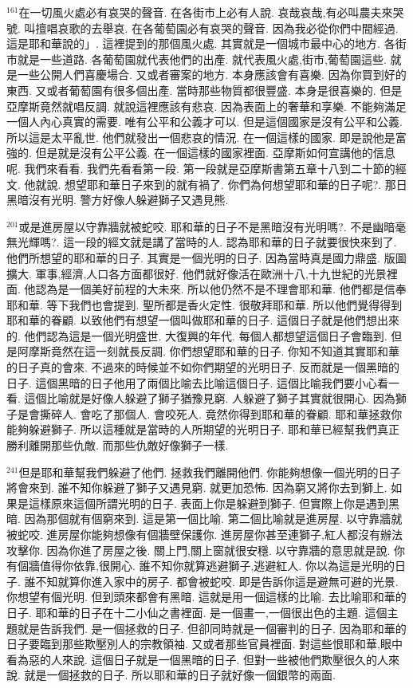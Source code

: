 \documentclass{book}
\begin{document}
$^{161}$在一切風火處必有哀哭的聲音.
在各街市上必有人說.
哀哉哀哉,有必叫農夫來哭號.
叫擅唱哀歌的去舉哀.
在各葡萄園必有哀哭的聲音.
因為我必從你們中間經過.
這是耶和華說的」.
這裡提到的那個風火處.
其實就是一個城市最中心的地方.
各街市就是一些道路.
各葡萄園就代表他們的出產.
就代表風火處,街市,葡萄園這些.
就是一些公開人們喜慶場合.
又或者審案的地方.
本身應該會有喜樂.
因為你買到好的東西.
又或者葡萄園有很多個出產.
當時那些物質都很豐盛.
本身是很喜樂的.
但是亞摩斯竟然就唱反調.
就說這裡應該有悲哀.
因為表面上的奢華和享樂.
不能夠滿足一個人內心真實的需要.
唯有公平和公義才可以.
但是這個國家是沒有公平和公義.
所以這是太平亂世.
他們就發出一個悲哀的情況.
在一個這樣的國家.
即是說他是富強的.
但是就是沒有公平公義.
在一個這樣的國家裡面.
亞摩斯如何宣講他的信息呢.
我們來看看.
我們先看看第一段.
第一段就是亞摩斯書第五章十八到二十節的經文.
他就說.
想望耶和華日子來到的就有禍了.
你們為何想望耶和華的日子呢?.
那日黑暗沒有光明.
警方好像人躲避獅子又遇見熊.

$^{201}$或是進房屋以守靠牆就被蛇咬.
耶和華的日子不是黑暗沒有光明嗎?.
不是幽暗毫無光輝嗎?.
這一段的經文就是講了當時的人.
認為耶和華的日子就要很快來到了.
他們所想望的耶和華的日子.
其實是一個光明的日子.
因為當時真是國力鼎盛.
版圖擴大.
軍事,經濟,人口各方面都很好.
他們就好像活在歐洲十八,十九世紀的光景裡面.
他認為是一個美好前程的大未來.
所以他仍然不是不理會耶和華.
他們都是信奉耶和華.
等下我們也會提到.
聖所都是香火定性.
很敬拜耶和華.
所以他們覺得得到耶和華的眷顧.
以致他們有想望一個叫做耶和華的日子.
這個日子就是他們想出來的.
他們認為這是一個光明盛世.
大復興的年代.
每個人都想望這個日子會臨到.
但是阿摩斯竟然在這一刻就長反調.
你們想望耶和華的日子.
你知不知道其實耶和華的日子真的會來.
不過來的時候並不如你們期望的光明日子.
反而就是一個黑暗的日子.
這個黑暗的日子他用了兩個比喻去比喻這個日子.
這個比喻我們要小心看一看.
這個比喻就是好像人躲避了獅子猶豫見窮.
人躲避了獅子其實就很開心.
因為獅子是會撕碎人.
會吃了那個人.
會咬死人.
竟然你得到耶和華的眷顧.
耶和華拯救你能夠躲避獅子.
所以這種就是當時的人所期望的光明日子.
耶和華已經幫我們真正勝利離開那些仇敵.
而那些仇敵好像獅子一樣.

$^{241}$但是耶和華幫我們躲避了他們.
拯救我們離開他們.
你能夠想像一個光明的日子將會來到.
誰不知你躲避了獅子又遇見窮.
就更加恐怖.
因為窮又將你去到獅上.
如果是這樣原來這個所謂光明的日子.
表面上你是躲避到獅子.
但實際上你是遇到黑暗.
因為那個就有個窮來到.
這是第一個比喻.
第二個比喻就是進房屋.
以守靠牆就被蛇咬.
進房屋你能夠想像有個牆壁保護你.
進房屋你甚至連獅子,紅人都沒有辦法攻擊你.
因為你進了房屋之後.
關上門,關上窗就很安穩.
以守靠牆的意思就是說.
你有個牆值得你依靠,很開心.
誰不知你就算逃避獅子,逃避紅人.
你以為這是光明的日子.
誰不知就算你進入家中的房子.
都會被蛇咬.
即是告訴你這是避無可避的光景.
你想望有個光明.
但到頭來都會有黑暗.
這就是用一個這樣的比喻.
去比喻耶和華的日子.
耶和華的日子在十二小仙之書裡面.
是一個畫一,一個很出色的主題.
這個主題就是告訴我們.
是一個拯救的日子.
但卻同時就是一個審判的日子.
因為耶和華的日子要臨到那些欺壓別人的宗教領袖.
又或者那些官員裡面.
對這些恨耶和華,眼中看為惡的人來說.
這個日子就是一個黑暗的日子.
但對一些被他們欺壓很久的人來說.
就是一個拯救的日子.
所以耶和華的日子就好像一個銀幣的兩面.
\end{document}
